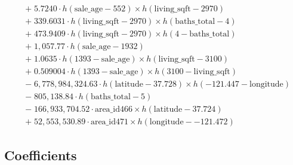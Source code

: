 \documentclass[
]{article}
\begin{document}
\[\begin{array}{rl}
& + \; 5.7240 \cdot h(\text{sale_age} - 552) \times h(\text{living_sqft} - 2970) \\
& + \; 339.6031 \cdot h(\text{living_sqft} - 2970) \times h(\text{baths_total} - 4) \\
& + \; 473.9409 \cdot h(\text{living_sqft} - 2970) \times h(4 - \text{baths_total}) \\
& + \; 1,057.77 \cdot h(\text{sale_age} - 1932) \\
& + \; 1.0635 \cdot h(1393 - \text{sale_age}) \times h(\text{living_sqft} - 3100) \\
& + \; 0.509004 \cdot h(1393 - \text{sale_age}) \times h(3100 - \text{living_sqft}) \\
& - \; 6,778,984,324.63 \cdot h(\text{latitude} - 37.728) \times h(-121.447 - \text{longitude}) \\
& - \; 805,138.84 \cdot h(\text{baths_total} - 5) \\
& - \; 166,933,704.52 \cdot \text{area_id466} \times h(\text{latitude} - 37.724) \\
& + \; 52,553,530.89 \cdot \text{area_id471} \times h(\text{longitude} - -121.472)
\end{array} 
\]

\subsection{Coefficients}\label{coefficients}
\end{document}
